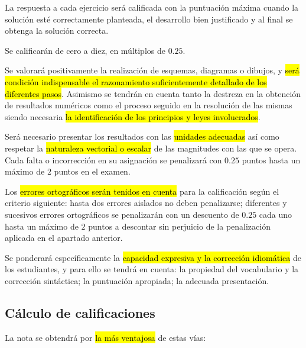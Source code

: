 \documentclass[a5paper,12pt]{extarticle}
\begin{document}
\begin{itemize}
{\footnotesize
	\item La respuesta a cada ejercicio será calificada con la puntuación máxima cuando la solución esté correctamente planteada, el desarrollo bien justificado y al final se obtenga la solución correcta. 
	\item Se calificarán de cero a diez, en múltiplos de $0.25$.
	\item Se valorará positivamente la realización de esquemas, diagramas o dibujos, y \hl{ser\'a condici\'on indispensable el razonamiento suficientemente detallado de los diferentes pasos}. Asimismo se tendrán en cuenta tanto la destreza en la obtención de resultados numéricos como el proceso seguido en la resolución de las mismas siendo necesaria \hl{la identificaci\'on de los principios y leyes involucrados}.
	\item Será necesario presentar los resultados con las \hl{unidades adecuadas} así como respetar la \hl{naturaleza vectorial o escalar} de las magnitudes con las que se opera. Cada falta o incorrección en su asignación se penalizará con $0.25$ puntos hasta un máximo de $2$ puntos en el examen.
	\newpage
	
	\item Los \hl{errores ortogr\'aficos ser\'an tenidos en cuenta} para la calificación según el criterio siguiente: hasta dos errores aislados no deben penalizarse; diferentes y sucesivos errores ortográficos se penalizarán con un descuento de $0.25$ cada uno hasta un máximo de $2$ puntos a descontar sin perjuicio de la penalización aplicada en el apartado anterior.
	\item Se ponderará específicamente la \hl{capacidad expresiva y la correcci\'on idiom\'atica} de los estudiantes, y para ello se tendrá en cuenta:   la propiedad del vocabulario y la corrección sintáctica; la puntuación apropiada; la adecuada presentación.
	}
\end{itemize}

\vspace{2ex}


\subsection{Cálculo de calificaciones}
\vspace{1ex}

La nota se obtendrá por \hl{la m\'as ventajosa} de estas vías:
\vspace{2ex}
\end{document}
